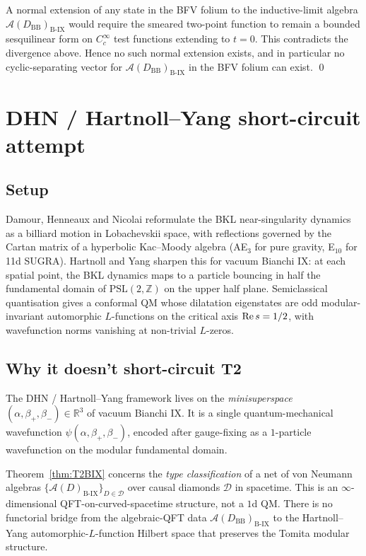 \documentclass[11pt,a4paper]{article}
\theoremstyle{definition}
\newcommand{\AAA}{\mathcal{A}}
\newcommand{\BIX}{\mathrm{B\text{-}IX}}
\newcommand{\BB}{\mathrm{BB}}
\newcommand{\R}{\mathbb{R}}
\begin{document}
A normal extension of any state in the BFV folium to the inductive-limit
algebra $\AAA(D_\BB)_\BIX$ would require the smeared two-point function
to remain a bounded sesquilinear form on $C_c^\infty$ test functions
extending to $t=0$. This contradicts the divergence above. Hence no such
normal extension exists, and in particular no cyclic-separating vector
for $\AAA(D_\BB)_\BIX$ in the BFV folium can exist. \qed

\section{DHN / Hartnoll--Yang short-circuit attempt}

\subsection{Setup}

Damour, Henneaux and Nicolai \cite{DHN2003} reformulate the BKL
near-singularity dynamics as a billiard motion in Lobachevskii space,
with reflections governed by the Cartan matrix of a hyperbolic Kac--Moody
algebra (AE${}_3$ for pure gravity, E${}_{10}$ for 11d SUGRA). Hartnoll
and Yang \cite{HartnollYang2025} sharpen this for vacuum Bianchi IX: at
each spatial point, the BKL dynamics maps to a particle bouncing in
half the fundamental domain of $\mathrm{PSL}(2,\mathbb Z)$ on the upper
half plane. Semiclassical quantisation gives a conformal QM whose
dilatation eigenstates are odd modular-invariant automorphic
$L$-functions on the critical axis ${\rm Re}\,s=1/2$, with wavefunction
norms vanishing at non-trivial $L$-zeros.

\subsection{Why it doesn't short-circuit T2}

The DHN / Hartnoll--Yang framework lives on the \emph{minisuperspace}
$(\alpha,\beta_+,\beta_-)\in\R^3$ of vacuum Bianchi IX. It is a single
quantum-mechanical wavefunction $\psi(\alpha,\beta_+,\beta_-)$, encoded
after gauge-fixing as a $1$-particle wavefunction on the modular
fundamental domain.

Theorem~\ref{thm:T2BIX} concerns the \emph{type classification} of a net
of von Neumann algebras $\{\AAA(D)_\BIX\}_{D\in\mathcal D}$ over causal
diamonds $\mathcal D$ in spacetime. This is an
$\infty$-dimensional QFT-on-curved-spacetime structure, not a $1$d QM.
There is no functorial bridge from the algebraic-QFT data
$\AAA(D_\BB)_\BIX$ to the Hartnoll--Yang automorphic-$L$-function
Hilbert space that preserves the Tomita modular structure.
\end{document}
